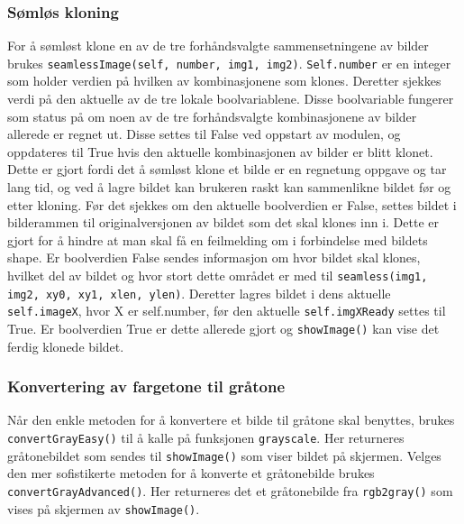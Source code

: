 \subsubsection{Sømløs kloning}
For å sømløst klone en av de tre forhåndsvalgte sammensetningene av bilder brukes \newline\texttt{seamlessImage(self, number, img1, img2)}.
\texttt{Self.number} er en integer som holder verdien på hvilken av kombinasjonene som klones. Deretter sjekkes verdi på den aktuelle av de tre lokale boolvariablene. Disse boolvariable fungerer som status på om noen av de tre forhåndsvalgte kombinasjonene av bilder allerede er regnet ut. Disse settes til False ved oppstart av modulen, og oppdateres til True hvis den aktuelle kombinasjonen av bilder er blitt klonet. Dette er gjort fordi det å sømløst klone et bilde er en regnetung oppgave og tar lang tid, og ved å lagre bildet kan brukeren raskt kan sammenlikne bildet før og etter kloning. Før det sjekkes om den aktuelle boolverdien er False, settes bildet i bilderammen til originalversjonen av bildet som det skal klones inn i. Dette er gjort for å hindre at man skal få en feilmelding om i forbindelse med bildets shape. Er boolverdien False sendes informasjon om hvor bildet skal klones, hvilket del av bildet og hvor stort dette området er med til \texttt{seamless(img1, img2, xy0, xy1, xlen, ylen)}. Deretter lagres bildet i dens aktuelle \texttt{self.imageX}, hvor X er self.number, før den aktuelle \texttt{self.imgXReady} settes til True. Er boolverdien True er dette allerede gjort og \texttt{showImage()} kan vise det ferdig klonede bildet. 

\subsubsection{Konvertering av fargetone til gråtone}
Når den enkle metoden for å konvertere et bilde til gråtone skal benyttes, brukes \texttt{convertGrayEasy()} til å kalle på funksjonen \texttt{grayscale}. Her returneres gråtonebildet som sendes til \texttt{showImage()} som viser bildet på skjermen. Velges den mer sofistikerte metoden for å konverte et gråtonebilde brukes \texttt{convertGrayAdvanced()}. Her returneres det et gråtonebilde fra \texttt{rgb2gray()} som vises på skjermen av \texttt{showImage()}.

